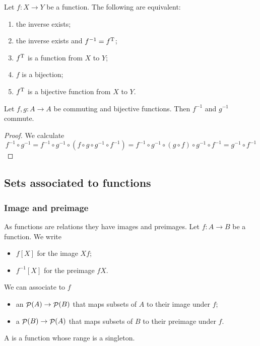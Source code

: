 \begin{lemma}
Let $f:X\to Y$ be a function. The following are equivalent:
\begin{enumerate} 
\item the inverse exists;
\item the inverse exists and $f^{-1} = f^{\mathrm{T}}$;
\item $f^{\mathrm{T}}$ is a function from $X$ to $Y$;
\item $f$ is a bijection;
\item $f^{\mathrm{T}}$ is a bijective function from $X$ to $Y$.
\end{enumerate}
\end{lemma}

\begin{lemma} \label{lemma:commutationInverse}
Let $f, g:A\to A$ be commuting and bijective functions. Then $f^{-1}$ and $g^{-1}$ commute.
\end{lemma}
\begin{proof}
We calculate
\[ f^{-1}\circ g^{-1} = f^{-1}\circ g^{-1}\circ (f\circ g \circ g^{-1} \circ f^{-1}) = f^{-1}\circ g^{-1}\circ (g\circ f) \circ g^{-1} \circ f^{-1} = g^{-1} \circ f^{-1} \]
\end{proof}



\subsection{Sets associated to functions}
\subsubsection{Image and preimage}
As functions are relations they have images and preimages. Let $f:A\to B$ be a function. We write
\begin{itemize}
\item $f[X]$ for the image $Xf$;
\item $f^{-1}[X]$ for the preimage $fX$.
\end{itemize}
We can associate to $f$
\begin{itemize}
\item an  $\mathop{\mathcal{P}}(A) \to \mathop{\mathcal{P}}(B)$ that maps subsets of $A$ to their image under $f$;
\item a  $\mathop{\mathcal{P}}(B) \to \mathop{\mathcal{P}}(A)$ that maps subsets of $B$ to their preimage under $f$.
\end{itemize}

A  is a function whose range is a singleton.

